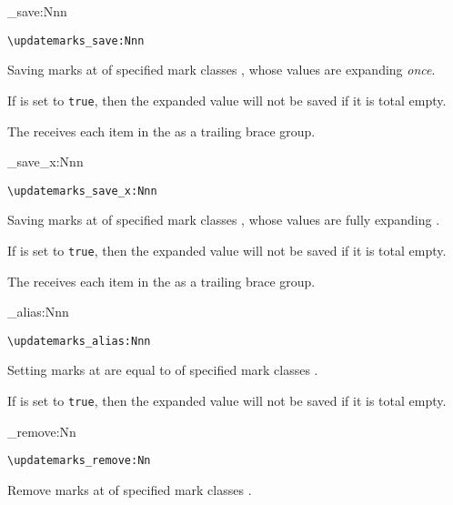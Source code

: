 \documentclass{l3doc}
\begin{document}
\begin{function}{\updatemarks_save:Nnn}
  \begin{syntax}
    \verb|\updatemarks_save:Nnn|   
  \end{syntax}
Saving marks at  of specified mark classes ,
whose values are expanding  \emph{once}.

If  is set to \texttt{true}, then the expanded value
will not be saved if it is total empty.

The  receives each item in the  
as a trailing brace group.
\end{function}

\begin{function}{\updatemarks_save_x:Nnn}
  \begin{syntax}
    \verb|\updatemarks_save_x:Nnn|   
  \end{syntax}
Saving marks at  of specified mark classes ,
whose values are fully expanding .

If  is set to \texttt{true}, then the expanded value
will not be saved if it is total empty.

The  receives each item in the  
as a trailing brace group.
\end{function}

\begin{function}{\updatemarks_alias:Nnn}
  \begin{syntax}
    \verb|\updatemarks_alias:Nnn|   
  \end{syntax}
Setting marks at  are equal to  
of specified mark classes .

If  is set to \texttt{true}, then the expanded value
will not be saved if it is total empty.
\end{function}

\begin{function}{\updatemarks_remove:Nn}
  \begin{syntax}
    \verb|\updatemarks_remove:Nn|  
  \end{syntax}
Remove marks at  of specified mark classes .
\end{function}
\end{document}
